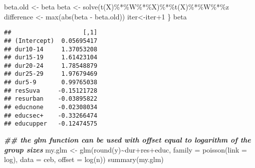 \documentclass[
]{book}
\newenvironment{Shaded}{\begin{snugshade}}{\end{snugshade}}
\newcommand{\AttributeTok}[1]{\textcolor[rgb]{0.77,0.63,0.00}{#1}}
\newcommand{\DecValTok}[1]{\textcolor[rgb]{0.00,0.00,0.81}{#1}}
\newcommand{\DocumentationTok}[1]{\textcolor[rgb]{0.56,0.35,0.01}{\textbf{\textit{#1}}}}
\newcommand{\FunctionTok}[1]{\textcolor[rgb]{0.00,0.00,0.00}{#1}}
\newcommand{\NormalTok}[1]{#1}
\newcommand{\OtherTok}[1]{\textcolor[rgb]{0.56,0.35,0.01}{#1}}
\newcommand{\SpecialCharTok}[1]{\textcolor[rgb]{0.00,0.00,0.00}{#1}}
\newcommand{\StringTok}[1]{\textcolor[rgb]{0.31,0.60,0.02}{#1}}
\begin{document}
\begin{Shaded}
\begin{Highlighting}[]
\NormalTok{  beta.old }\OtherTok{\textless{}{-}}\NormalTok{ beta}
\NormalTok{  beta }\OtherTok{\textless{}{-}} \FunctionTok{solve}\NormalTok{(}\FunctionTok{t}\NormalTok{(X)}\SpecialCharTok{\%*\%}\NormalTok{W}\SpecialCharTok{\%*\%}\NormalTok{X)}\SpecialCharTok{\%*\%}\FunctionTok{t}\NormalTok{(X)}\SpecialCharTok{\%*\%}\NormalTok{W}\SpecialCharTok{\%*\%}\NormalTok{z}
\NormalTok{  difference }\OtherTok{\textless{}{-}} \FunctionTok{max}\NormalTok{(}\FunctionTok{abs}\NormalTok{(beta }\SpecialCharTok{{-}}\NormalTok{ beta.old))}
\NormalTok{  iter}\OtherTok{\textless{}{-}}\NormalTok{iter}\SpecialCharTok{+}\DecValTok{1}
\NormalTok{\}}
\NormalTok{beta}
\end{Highlighting}
\end{Shaded}

\begin{verbatim}
##                    [,1]
## (Intercept)  0.05695417
## dur10-14     1.37053208
## dur15-19     1.61423104
## dur20-24     1.78548879
## dur25-29     1.97679469
## dur5-9       0.99765038
## resSuva     -0.15121728
## resurban    -0.03895822
## educnone    -0.02308034
## educsec+    -0.33266474
## educupper   -0.12474575
\end{verbatim}

\begin{Shaded}
\begin{Highlighting}[]
\DocumentationTok{\#\# the glm function can be used with offset equal to logarithm of the group sizes}
\NormalTok{my.glm }\OtherTok{\textless{}{-}} \FunctionTok{glm}\NormalTok{(}\FunctionTok{round}\NormalTok{(y)}\SpecialCharTok{\textasciitilde{}}\NormalTok{dur}\SpecialCharTok{+}\NormalTok{res}\SpecialCharTok{+}\NormalTok{educ, }\AttributeTok{family =} \FunctionTok{poisson}\NormalTok{(}\AttributeTok{link =} \StringTok{\textquotesingle{}log\textquotesingle{}}\NormalTok{), }\AttributeTok{data =}\NormalTok{ ceb, }\AttributeTok{offset =} \FunctionTok{log}\NormalTok{(n))}
\FunctionTok{summary}\NormalTok{(my.glm)}
\end{Highlighting}
\end{Shaded}
\end{document}

